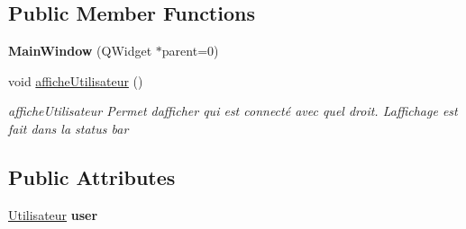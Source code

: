 \subsection*{Public Member Functions}
\begin{DoxyCompactItemize}
\item 
\mbox{\label{class_main_window_a8b244be8b7b7db1b08de2a2acb9409db}} 
{\bfseries Main\+Window} (Q\+Widget $\ast$parent=0)
\item 
\mbox{\label{class_main_window_ac600bafb6e03043944197a8eb6cf3cdb}} 
void \mbox{\hyperlink{class_main_window_ac600bafb6e03043944197a8eb6cf3cdb}{affiche\+Utilisateur}} ()
\begin{DoxyCompactList}\small\item\em affiche\+Utilisateur Permet d\textquotesingle{}afficher qui est connecté avec quel droit. L\textquotesingle{}affichage est fait dans la status bar \end{DoxyCompactList}\end{DoxyCompactItemize}
\subsection*{Public Attributes}
\begin{DoxyCompactItemize}
\item 
\mbox{\label{class_main_window_a6d37265ebccf5d8891e033be9348133e}} 
\mbox{\hyperlink{class_utilisateur}{Utilisateur}} {\bfseries user}
\end{DoxyCompactItemize}
